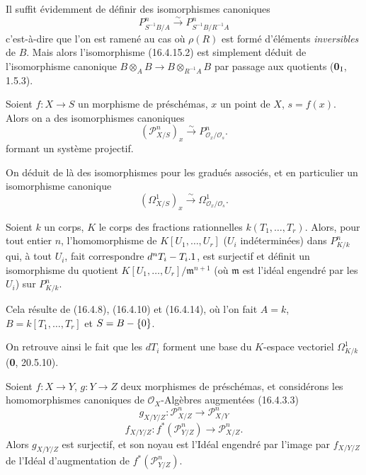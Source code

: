 Il suffit évidemment de définir des isomorphismes canoniques
\[
  P_{S^{-1}B/A}^n\xrightarrow{\sim}P_{S^{-1}B/R^{-1}A}^n
  \tag{16.4.15.2}
  \label{IV.16.4.15.2}
\]
c'est-à-dire que l'on est ramené au cas où $\rho(R)$ est formé d'éléments
\emph{inversibles} de $B$. Mais alors l'isomorphisme (16.4.15.2) est simplement
déduit de l'isomorphisme canonique
$B\otimes_A B\to B\otimes_{R^{-1}A}B$ par passage aux quotients
(\textbf{0}$_{\rm I}$, 1.5.3).

\begin{corollary}[16.4.16]
\label{IV.16.4.16}
Soient $f:X\to S$ un morphisme de préschémas, $x$ un point de $X$,
$s=f(x)$. Alors on a des isomorphismes canoniques
\[
  (\mathscr{P}_{X/S}^n)_x\xrightarrow{\sim}
  P_{\mathcal{O}_x/\mathcal{O}_s}^n.
  \tag{16.4.16.1}
  \label{IV.16.4.16.1}
\]
formant un système projectif.
\end{corollary}

On déduit de là des isomorphismes pour les gradués associés, et en particulier
un isomorphisme canonique
\[
  (\varOmega_{X/S}^1)_x\xrightarrow{\sim}
  \Omega_{\mathcal{O}_x/\mathcal{O}_s}^1.
  \tag{16.4.16.2}
  \label{IV.16.4.16.2}
\]

\begin{corollary}[16.4.17]
\label{IV.16.4.17}
Soient $k$ un corps, $K$ le corps des fractions rationnelles
$k(T_1,\ldots,T_r)$. Alors, pour tout entier $n$, l'homomorphisme de
$K[U_1,\ldots,U_r]$ ($U_i$ indéterminées) dans $P_{K/k}^n$ qui, à tout $U_i$,
fait correspondre $d^nT_i- T_i.1$, est surjectif et définit un isomorphisme
du quotient $K[U_1,\ldots,U_r]/\mathfrak{m}^{n+1}$ (où $\mathfrak{m}$ est
l'idéal engendré par les $U_i$) sur $P_{K/k}^n$.
\end{corollary}

Cela résulte de (16.4.8), (16.4.10) et (16.4.14), où l'on fait $A=k$,
$B=k[T_1,\ldots,T_r]$ et $S=B-\{0\}$.

On retrouve ainsi le fait que les $dT_i$ forment une base du $K$-espace
vectoriel $\Omega_{K/k}^1$ (\textbf{0}, 20.5.10).

\begin{proposition}[16.4.18]
\label{IV.16.4.18}
Soient $f:X\to Y$, $g:Y\to Z$ deux morphismes de préschémas, et considérons
les homomorphismes canoniques de $\mathcal{O}_X$-Algèbres augmentées
\textup{(16.4.3.3)}
\[
  g_{X/Y/Z}:\mathscr{P}_{X/Z}^n\longrightarrow\mathscr{P}_{X/Y}^n
  \tag{16.4.18.1}
  \label{IV.16.4.18.1}
\]
\[
  f_{X/Y/Z}:f^*(\mathscr{P}_{Y/Z}^n)
  \longrightarrow\mathscr{P}_{X/Z}^n.
  \tag{16.4.18.2}
  \label{IV.16.4.18.2}
\]
Alors $g_{X/Y/Z}$ est surjectif, et son noyau est l'Idéal engendré par l'image
par $f_{X/Y/Z}$ de l'Idéal d'augmentation de
$f^*(\mathscr{P}_{Y/Z}^n)$.
\end{proposition}

